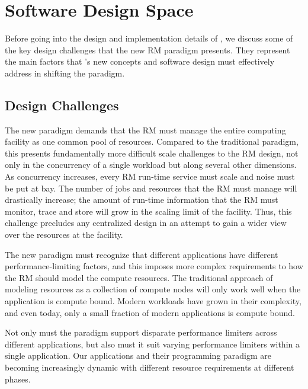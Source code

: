 \section{Software Design Space}
\label{sect:design-space}
Before going into the design and implementation details
of \flux, we discuss some of the key design challenges
that the new RM paradigm presents. They represent
the main factors that \flux's new concepts and software
design must effectively address in shifting the paradigm.

\subsection{Design Challenges}
\vspace{1ex}
 The new paradigm
demands that the RM must manage the entire computing facility
as one common pool of resources. Compared to the traditional
paradigm, this presents fundamentally more difficult scale
challenges to the RM design, not only in the concurrency
of a single workload but along several other dimensions.
As concurrency increases, every RM run-time service must
scale and noise must be put at bay. The number of jobs
and resources that the RM must manage will drastically
increase; the amount of run-time information that the RM
must monitor, trace and store will grow in the scaling
limit of the facility. Thus, this challenge precludes
any centralized design in an attempt to gain a wider
view over the resources at the facility.

\vspace{1ex}
 The new paradigm must
recognize that different applications have different
performance-limiting factors, and this imposes more complex
requirements to how the RM should model the compute resources.
The traditional approach of modeling resources as a collection
of compute nodes will only work well when the application
is compute bound. Modern workloads have grown in their
complexity, and even today, only a small fraction
of modern applications is compute bound.

\vspace{1ex}
 Not only must the paradigm
support disparate performance limiters across different
applications, but also must it suit varying performance
limiters within a single application. Our applications
and their programming paradigm are becoming increasingly
dynamic with different resource requirements at different phases.

